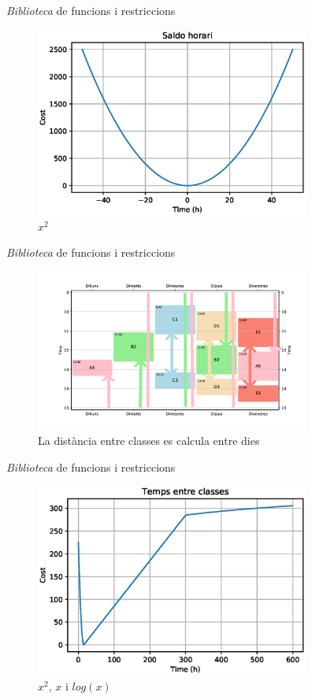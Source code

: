 \documentclass[twocolumn]{beamer}
\begin{document}
\begin{frame}{\textit{Biblioteca} de funcions i restriccions}
\begin{figure}
	\includegraphics[width=9cm]{saldo}
	\caption{$x^2$}
\end{figure}
\end{frame}
\begin{frame}{\textit{Biblioteca} de funcions i restriccions}
\begin{figure}
	\includegraphics[width=9cm]{../PD_Plots/llibreria_funcs/horari}
	\caption{La distància entre classes es calcula entre dies}
\end{figure}
\end{frame}

\begin{frame}{\textit{Biblioteca} de funcions i restriccions}
\begin{figure}
	\includegraphics[width=9cm]{interclass}
	\caption{$x^2$, $x$ i $log(x)$}
\end{figure}
\end{frame}
\end{document}
